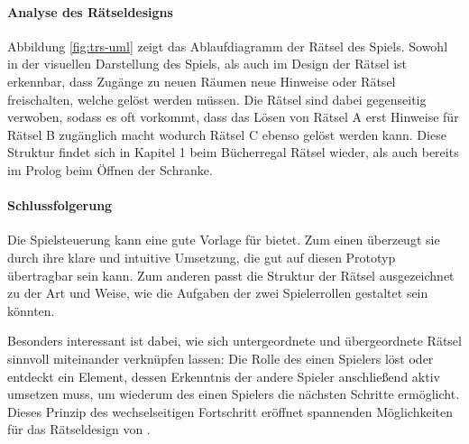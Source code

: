 \paragraph{Analyse des Rätseldesigns}
Abbildung \ref{fig:trs-uml} zeigt das Ablaufdiagramm der Rätsel des Spiels. Sowohl in der visuellen Darstellung des Spiels, als auch im Design der Rätsel ist erkennbar, dass Zugänge zu neuen Räumen neue Hinweise oder Rätsel freischalten, welche gelöst werden müssen. Die Rätsel sind dabei gegenseitig verwoben, sodass es oft vorkommt, dass das Lösen von Rätsel A erst Hinweise für Rätsel B zugänglich macht wodurch Rätsel C ebenso gelöst werden kann. Diese Struktur findet sich in Kapitel 1 beim Bücherregal Rätsel wieder, als auch bereits im Prolog beim Öffnen der Schranke.

\paragraph{Schlussfolgerung}
Die Spielsteuerung kann eine gute Vorlage für  bietet. Zum einen überzeugt sie durch ihre klare und intuitive Umsetzung, die gut auf diesen Prototyp übertragbar sein kann. Zum anderen passt die Struktur der Rätsel ausgezeichnet zu der Art und Weise, wie die Aufgaben der zwei Spielerrollen gestaltet sein könnten.

Besonders interessant ist dabei, wie sich untergeordnete und übergeordnete Rätsel sinnvoll miteinander verknüpfen lassen: Die Rolle des einen Spielers löst oder entdeckt ein Element, dessen Erkenntnis der andere Spieler anschließend aktiv umsetzen muss, um wiederum des einen Spielers die nächsten Schritte ermöglicht. Dieses Prinzip des wechselseitigen Fortschritt eröffnet spannenden Möglichkeiten für das Rätseldesign von .

